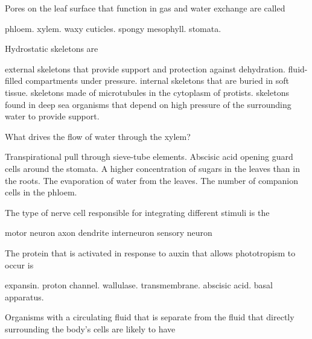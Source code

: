 \question
Pores on the leaf surface that function in gas and water exchange are called

\begin{choices}
\choice phloem. 
\choice xylem. 
\choice waxy cuticles. 
\choice spongy mesophyll. 
\correctchoice stomata. 
\end{choices}



\question
Hydrostatic skeletons are 

\begin{choices}
\choice external skeletons that provide support and protection against dehydration. 
\correctchoice fluid-filled compartments under pressure. 
\choice internal skeletons that are buried in soft tissue.  
\choice skeletons made of microtubules in the cytoplasm of protists. 
\choice skeletons found in deep sea organisms that depend on high pressure of the surrounding water to provide support. 
\end{choices}

\question
What drives the flow of water through the xylem?

\begin{choices}
\choice Transpirational pull through sieve-tube elements. 
\choice Abscisic acid opening guard cells around the stomata. 
\choice A higher concentration of sugars in the leaves than in the roots. 
\correctchoice The evaporation of water from the leaves. 
\choice The number of companion cells in the phloem.  
\end{choices}

\question
The type of nerve cell responsible for integrating different stimuli is the 

\begin{choices}
\choice motor neuron 
\choice axon 
\choice dendrite 
\correctchoice interneuron 
\choice sensory neuron 
\end{choices}

\question
The protein that is activated in response to auxin that allows phototropism to occur is

\begin{choices}
\correctchoice expansin. 
\choice proton channel. 
\choice wallulase. 
\choice transmembrane. 
\choice abscisic acid. 
\choice basal apparatus. 
\end{choices}

\question
Organisms with a circulating fluid that is separate from the fluid that directly surrounding the body's cells are likely to have

